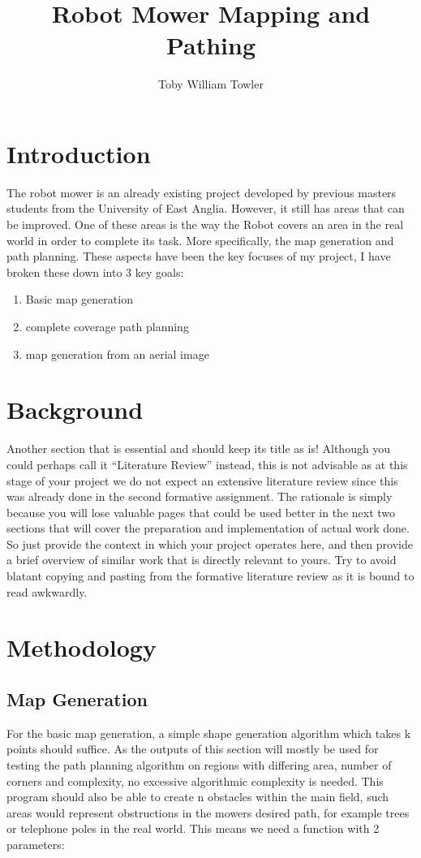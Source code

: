 \documentclass[final]{cmpreport_02}
\title{Robot Mower Mapping and Pathing}
\author{Toby William Towler}
\begin{document}
\section{Introduction}

The robot mower is an already existing project developed by previous masters students from the University of East Anglia. However, it still has areas that can be improved. One of these areas is the way the Robot covers an area in the real world in order to complete its task.
More specifically, the map generation and path planning. These aspects have been the key focuses of my project, I have broken these down into 3 key goals:
\begin{enumerate}
	\item Basic map generation
	\item complete coverage path planning
	\item map generation from an aerial image
\end{enumerate}




\section{Background}

Another section that is essential and should keep its title as is! Although you could perhaps call it ``Literature Review'' instead, this is not advisable as at this stage of your project we do not expect an extensive literature review since this was already done in the second formative assignment. The rationale is simply because you will lose valuable pages that could be used better in the next two sections that will cover the preparation and implementation of actual work done. So just provide the context in which your project operates here, and then provide a brief overview of similar work that is directly relevant to yours. Try to avoid blatant copying and pasting from the formative literature review as it is bound to read awkwardly.

\section{Methodology}

\subsection{Map Generation}
For the basic map generation, a simple shape generation algorithm which takes k points should suffice. As the outputs of this section will mostly be used for testing the path planning algorithm on regions with differing area, number of corners and complexity, no excessive algorithmic complexity is needed. 
This program should also be able to create n obstacles within the main field, such areas would represent obstructions in the mowers desired path, for example trees or telephone poles in the real world.
This means we need a function with 2 parameters:
\end{document}
